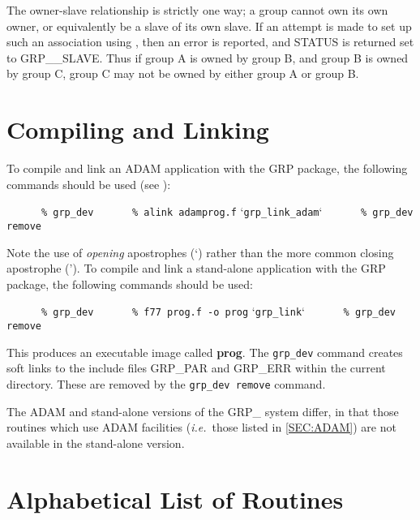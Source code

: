 The owner-slave relationship is strictly one way; a group cannot own its own
owner, or equivalently be a slave of its own slave. If an attempt is
made to set up such an association using , then an error is reported,
and STATUS is returned set to GRP\_\_SLAVE. Thus if group A is owned by group B,
and group B is owned by group C, group C may not be owned by either group A or
group B.

\section{Compiling and Linking}
To compile and link an ADAM application with the GRP package, the following
commands should be used (see ):

\small
\verb#      % grp_dev#
\verb#      % alink adamprog.f# `\verb#grp_link_adam#`
\verb#      % grp_dev remove#
\normalsize

Note the use of {\em opening} apostrophes (`) rather than the more common
closing apostrophe ('). To compile and link a stand-alone application with
the GRP package, the following commands should be used:

\small
\verb#      % grp_dev#
\verb#      % f77 prog.f -o prog# `\verb#grp_link#`
\verb#      % grp_dev remove#
\normalsize

This produces an executable image called {\bf prog}. The \verb+grp_dev+
command creates soft links to the include files GRP\_PAR and GRP\_ERR
within the current directory. These are removed by the \verb+grp_dev remove+ command.

The ADAM and stand-alone versions of the GRP\_ system differ, in that those
routines which use ADAM facilities ({\em i.e.}\ those listed in
\ref{SEC:ADAM}) are not available in the stand-alone version.

\appendix
\section{Alphabetical List of Routines}


